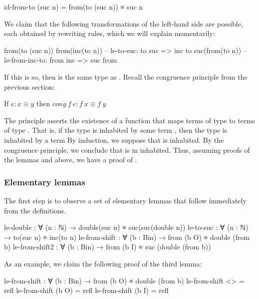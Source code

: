 \begin{colored}[elm]
id-from-to (suc n) = from(to (suc n)) ≡ suc n
\end{colored}

We claim that the following transformations of the left-hand side are possible, each obtained by rewriting rules, which we will explain momentarily:

\begin{colored}[elm]
from(to (suc n))
from(inc(to n))  -- le-to-suc: to suc => inc to
suc(from(to n))  -- le-from-inc-to: from inc => suc from
\end{colored}

If this is so, then  is the same type as .  Recall the congruence principle from the previous section:

\begin{indent}
If $e : x \equiv y$ then $cong\ f\ e: f\ x \equiv f\ y$
\end{indent}

The principle asserts the existence of a function  that maps terms of type   to terms of type .   That is, if the type   is inhabited by some term , then the type  is inhabited by a term 
By induction, we suppose that  is inhabited.  By the congruence principle, we conclude that  is in inhabited. Thus, assuming proofs of the lemmas  and above, we have a proof of .


\subsubsection{Elementary lemmas}

The first step is to observe a set of elementary lemmas that follow immediately from the definitions.  

\begin{colored}[elm]
le-double : ∀ (n : ℕ) → double(suc n) ≡ suc(suc(double n))
le-to-suc : ∀ (n : ℕ) → to(suc n) ≡ inc(to n)
le-from-shift : ∀ (b : Bin) → from (b O) ≡ double (from b)
le-from-shift2 : ∀ (b : Bin) → from (b I) ≡ suc (double (from b))
\end{colored}

As an example, we claim the following proof of the third lemma:

\begin{colored}[elm]
le-from-shift : ∀ (b : Bin) → from (b O) ≡ double (from b)
le-from-shift <> = refl
le-from-shift (b O) = refl
le-from-shift (b I) = refl
\end{colored}

